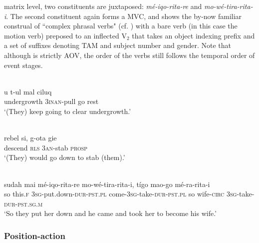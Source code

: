 matrix level, two constituents are juxtaposed: \textit{mé-iqo-rita-re} and \textit{mo-wé-tira-rita-i}. The second constituent again forms a MVC, and shows the by-now familiar construal of  ``complex phrasal verbs" (cf. \citealt[57]{devries2004}) with a bare verb (in this case the motion verb) preposed to an inflected V$_2$ that takes an object indexing prefix and a set of suffixes denoting TAM and subject number and gender. Note that although  is strictly AOV, the order of the verbs still follows the temporal order of event stages.

\ea \label{Bunaq_60}
\\
\gll u t-ul mal ciluq \\
undergrowth 3\textsc{inan}-pull go rest \\
\glft ‘(They) keep going to clear undergrowth.’\\
\z

\ea \label{Bunaq_n1}
\\
\gll rebel si, g-ota gie \\
descend \textsc{rls} 3\textsc{an}-stab \textsc{prosp} \\
\glft ‘(They) would go down to stab (them).’\\ 
\z

\ea \label{Inan_20}
\\
\gll sudah mai mé-iqo-rita-re mo-wé-tira-rita-i, tígo mao-go mé-ra-rita-i \\
so this.\textsc{f} 3\textsc{sg}-put.down-\textsc{dur}-\textsc{pst}.\textsc{pl} come-3\textsc{sg}-take-\textsc{dur}-\textsc{pst}.\textsc{pl} so wife-\textsc{circ} 3\textsc{sg}-take-\textsc{dur}-\textsc{pst}.\textsc{sg}.\textsc{m} \\
\glft `So they put her down and he came and took her to become his wife.'\\ 
\z

\subsubsection{Position-action}\label{sec:position-action}

